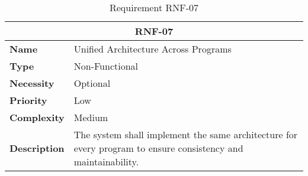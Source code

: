 \begin{table}[H]
    \centering
    \begin{tabular}{l p{10cm}}
        \toprule
        \multicolumn{2}{c}{\textbf{RNF-07}} \\
        \toprule
        \textbf{Name}         & Unified Architecture Across Programs \\
        \textbf{Type}         & Non-Functional \\
        \textbf{Necessity}    & Optional \\
        \textbf{Priority}     & Low \\
        \textbf{Complexity}   & Medium \\
        \textbf{Description}  & The system shall implement the same architecture for every program to ensure consistency and maintainability. \\
        \bottomrule
    \end{tabular}
\caption{Requirement RNF-07}\label{tab:rnf-07}
\end{table}
